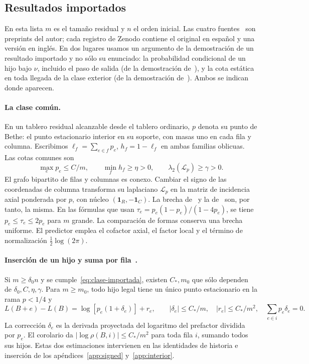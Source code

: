 \subsection{Resultados importados}\label{sec:importados}
En esta lista \(m\) es el tamaño residual y \(n\) el orden inicial. Las cuatro
fuentes~\cite{pv,ef,pc,tc} son preprints del autor; cada registro de Zenodo contiene el original en
español y una versión en inglés. En dos lugares usamos un argumento de la demostración de un resultado
importado y no sólo su enunciado: la probabilidad condicional de un hijo bajo \(\nu\), incluido el paso
de salida (de la demostración de~\cite[teo.~8.1]{pc}), y la cota estática en toda llegada de la clase
exterior (de la demostración de~\cite[cor.~6.8]{tc}). Ambos se indican donde aparecen.



\paragraph{La clase común.} En un tablero residual alcanzable desde el tablero ordinario, \(p\) denota
su punto de Bethe: el punto estacionario interior en su soporte, con masas uno en cada fila y columna.
Escribimos \(\ell_f=\sum_{e\in f}p_e\),
\(h_f=1-\ell_f\) en ambas familias oblicuas. Las cotas comunes son
\begin{equation}\label{eq:clase-importada}
 \max_e p_e\le C/m,\qquad \min_f h_f\ge\eta>0,\qquad
 \lambda_2(\mathcal L_p)\ge\gamma>0 .
\end{equation}
El grafo bipartito de filas y columnas es conexo. Cambiar el signo de las coordenadas de
columna transforma su laplaciano \(\mathcal L_p\) en la matriz de incidencia axial ponderada
por \(p\), con núcleo \((\mathbf1_R,-\mathbf1_C)\). La brecha de~\cite{pc} y la
de~\cite{tc} son, por tanto, la misma. En las fórmulas que usan
\(\tau_e=p_e(1-p_e)/(1-4p_e)\), se tiene \(p_e\le\tau_e\le2p_e\) para \(m\) grande.
La comparación de formas conserva una brecha uniforme. El predictor emplea el cofactor
axial, el factor local y el término de normalización \(\tfrac12\log(2\pi)\).

\paragraph{Inserción de un hijo y suma por fila~\cite[teo.~7.1 y cor.~7.2]{pc}.}
Si \(m\ge\delta_0n\) y se cumple~\eqref{eq:clase-importada}, existen \(C_*,m_0\)
que sólo dependen de \(\delta_0,C,\eta,\gamma\). Para \(m\ge m_0\), todo hijo legal
tiene un único punto estacionario en la rama \(p<1/4\) y
\[
 L(B+e)-L(B)=\log[p_e(1+\delta_e)]+r_e,\qquad
 |\delta_e|\le C_*/m,\quad |r_e|\le C_*/m^2,\quad \sum_{e\in i}p_e\delta_e=0 .
\]
La corrección \(\delta_e\) es la derivada proyectada del logaritmo del prefactor dividida
por \(p_e\). El corolario da \(|\log\rho(B,i)|\le C_*/m^2\) para toda fila \(i\),
sumando todos sus hijos. Estas dos estimaciones intervienen en las identidades de historia
e inserción de los apéndices~\ref{app:signed} y~\ref{app:interior}.


